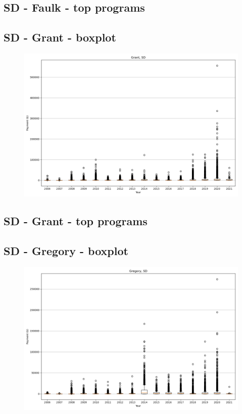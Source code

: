 \subsection*{SD - Faulk - top programs}

\newpage
\subsection*{SD - Grant - boxplot}
\begin{figure}[h]
\centering
\includegraphics[width=7in]{../output/boxplots/counties/Grant-SD_boxplot.png}
\end{figure}


\subsection*{SD - Grant - top programs}

\newpage
\subsection*{SD - Gregory - boxplot}
\begin{figure}[h]
\centering
\includegraphics[width=7in]{../output/boxplots/counties/Gregory-SD_boxplot.png}
\end{figure}


